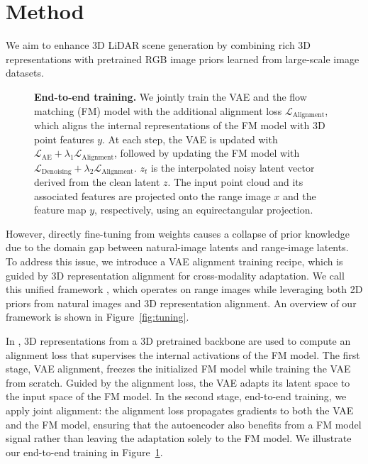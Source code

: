 \section{Method}
\label{sec:method}

We aim to enhance 3D LiDAR scene generation by combining rich 3D representations with pretrained RGB image priors learned from large-scale image datasets. 

\begin{figure}[t!]
\centering
\def\svgwidth{0.99\linewidth} 

\caption{\textbf{End-to-end training.} We jointly train the VAE and the flow matching (FM) model with the additional alignment loss $\mathcal{L}_{\textrm{Alignment}}$, which aligns the internal representations of the FM model with 3D point features $y$. At each step, the VAE is updated with $\mathcal{L}_{\textrm{AE}} + \lambda_1 \mathcal{L}_{\textrm{Alignment}}$, followed by updating the FM model with $\mathcal{L}_{\textrm{Denoising}} + \lambda_2 \mathcal{L}_{\textrm{Alignment}}$.
$z_t$ is the interpolated noisy latent vector derived from the clean latent $z$.
The input point cloud and its associated features are projected onto the range image $x$ and the feature map $y$, respectively, using an equirectangular projection.
}
\label{fig:pipeline}
\end{figure}
However, directly fine-tuning from  weights causes a collapse of prior knowledge due to the domain gap between natural-image latents and range-image latents.
To address this issue, we introduce a VAE alignment training recipe, which is guided by 3D representation alignment for cross-modality adaptation.
We call this unified framework \ours, which operates on range images while leveraging both 2D priors from natural images and 3D representation alignment. 
An overview of our framework is shown in Figure~\ref{fig:tuning}.

In \ours, 3D representations from a 3D pretrained backbone are used to compute an alignment loss that supervises the internal activations of the FM model. The first stage, VAE alignment, freezes the initialized FM model while training the VAE from scratch. Guided by the alignment loss, the VAE adapts its latent space to the input space of the FM model. In the second stage, end-to-end training, we apply joint alignment: the alignment loss propagates gradients to both the VAE and the FM model, ensuring that the autoencoder also benefits from a FM model signal rather than leaving the adaptation solely to the FM model. We illustrate our end-to-end training in Figure~\ref{fig:pipeline}.

